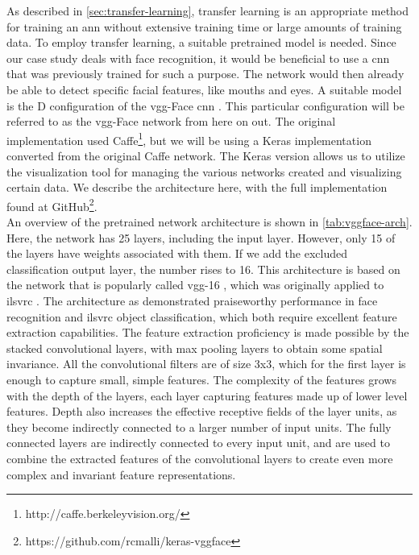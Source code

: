 As described in \autoref{sec:transfer-learning}, transfer learning is an appropriate method for training an \acrshort{ann} without extensive training time or large amounts of training data. To employ transfer learning, a suitable pretrained model is needed. Since our case study deals with face recognition, it would be beneficial to use a \acrshort{cnn} that was previously trained for such a purpose. The network would then already be able to detect specific facial features, like mouths and eyes. A suitable model is the D configuration of the \acrshort{vgg}-Face \acrshort{cnn} \cite{deep-face-rec}. This particular configuration will be referred to as the \acrshort{vgg}-Face network from here on out. The original implementation used Caffe\footnote{http://caffe.berkeleyvision.org/}, but we will be using a Keras implementation converted from the original Caffe network. The Keras version allows us to utilize the visualization tool for managing the various networks created and visualizing certain data. We describe the architecture here, with the full implementation found at GitHub\footnote{https://github.com/rcmalli/keras-vggface}. \\

\noindent An overview of the pretrained network architecture is shown in \autoref{tab:vggface-arch}. Here, the network has 25 layers, including the input layer. However, only 15 of the layers have weights associated with them. If we add the excluded classification output layer, the number rises to 16. This architecture is based on the network that is popularly called \acrshort{vgg}-16 \cite{vgg}, which was originally applied to \acrshort{ilsvrc} \cite{imagenet}. The architecture as demonstrated praiseworthy performance in face recognition and \acrshort{ilsvrc} object classification, which both require excellent feature extraction capabilities. The feature extraction proficiency is made possible by the stacked convolutional layers, with max pooling layers to obtain some spatial invariance. All the convolutional filters are of size 3x3, which for the first layer is enough to capture small, simple features. The complexity of the features grows with the depth of the layers, each layer capturing features made up of lower level features. Depth also increases the effective receptive fields of the layer units, as they become indirectly connected to a larger number of input units. The fully connected layers are indirectly connected to every input unit, and are used to combine the extracted features of the convolutional layers to create even more complex and invariant feature representations. \\


